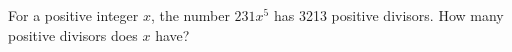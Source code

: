 For a positive integer $ x $, the number $ 231x^5 $ has 3213 positive divisors. How many positive divisors does $ x $ have?
